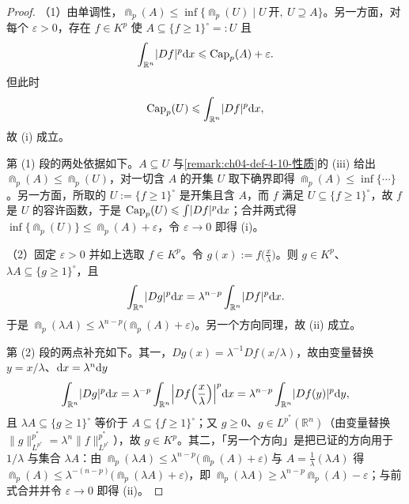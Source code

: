 \documentclass[../../main.tex]{subfiles}%
\begin{document}
\begin{proof}
（1）由单调性，$\Cap_p(A)\leqslant\inf\{\Cap_p(U)\mid U\ \text{开},\ U\supseteq A\}$。另一方面，对每个 $\varepsilon>0$，存在 $f\in K^p$ 使 $A\subseteq\{f\geqslant1\}^{\circ}=:U$ 且
\begin{align*}
\int_{\mathbb{R}^n}\lvert Df\rvert^p\mathrm{d} x\leqslant\operatorname{Cap}_p(A)+\varepsilon .
\end{align*}
但此时
\begin{align*}
\operatorname{Cap}_p(U)\leqslant\int_{\mathbb{R}^n}\lvert Df\rvert^p\mathrm{d} x ,
\end{align*}
故 (i) 成立。

第 (1) 段的两处依据如下。$A\subseteq U$ 与\cref{remark:ch04-def-4-10-性质}的 (iii) 给出 $\Cap_p(A)\leqslant\Cap_p(U)$，对一切含 $A$ 的开集 $U$ 取下确界即得 $\Cap_p(A)\leqslant\inf\{\cdots\}$。另一方面，所取的 $U:=\{f\geqslant1\}^{\circ}$ 是开集且含 $A$，而 $f$ 满足 $U\subseteq\{f\geqslant1\}^{\circ}$，故 $f$ 是 $U$ 的容许函数，于是 $\operatorname{Cap}_p(U)\leqslant\int\lvert Df\rvert^p\mathrm{d} x$；合并两式得 $\inf\{\Cap_p(U)\}\leqslant\Cap_p(A)+\varepsilon$，令 $\varepsilon\to0$ 即得 (i)。%

（2）固定 $\varepsilon>0$ 并如上选取 $f\in K^p$。令 $g(x):=f\bigl(\frac{x}{\lambda}\bigr)$。则 $g\in K^p$、$\lambda A\subseteq\{g\geqslant1\}^{\circ}$，且
\begin{align*}
\int_{\mathbb{R}^n}\lvert Dg\rvert^p\mathrm{d} x=\lambda^{n-p}\int_{\mathbb{R}^n}\lvert Df\rvert^p\mathrm{d} x .
\end{align*}
于是 $\Cap_p(\lambda A)\leqslant\lambda^{n-p}\bigl(\Cap_p(A)+\varepsilon\bigr)$。另一个方向同理，故 (ii) 成立。

第 (2) 段的两点补充如下。其一，$Dg(x)=\lambda^{-1}Df(x/\lambda)$，故由变量替换 $y=x/\lambda$、$\mathrm{d} x=\lambda^n\mathrm{d} y$
\begin{align*}
\int_{\mathbb{R}^n}\lvert Dg\rvert^p\mathrm{d} x=\lambda^{-p}\int_{\mathbb{R}^n}\Bigl\lvert Df\Bigl(\frac{x}{\lambda}\Bigr)\Bigr\rvert^p\mathrm{d} x=\lambda^{n-p}\int_{\mathbb{R}^n}\lvert Df(y)\rvert^p\mathrm{d} y ,
\end{align*}
且 $\lambda A\subseteq\{g\geqslant1\}^{\circ}$ 等价于 $A\subseteq\{f\geqslant1\}^{\circ}$；又 $g\geqslant0$、$g\in L^{p^*}(\mathbb{R}^n)$（由变量替换 $\lVert g\rVert_{L^{p^*}}^{p^*}=\lambda^n\lVert f\rVert_{L^{p^*}}^{p^*}$），故 $g\in K^p$。其二，「另一个方向」是把已证的方向用于 $1/\lambda$ 与集合 $\lambda A$：由 $\Cap_p(\lambda A)\leqslant\lambda^{n-p}\bigl(\Cap_p(A)+\varepsilon\bigr)$ 与 $A=\frac1\lambda(\lambda A)$ 得 $\Cap_p(A)\leqslant\lambda^{-(n-p)}\bigl(\Cap_p(\lambda A)+\varepsilon\bigr)$，即 $\Cap_p(\lambda A)\geqslant\lambda^{n-p}\Cap_p(A)-\varepsilon$；与前式合并并令 $\varepsilon\to0$ 即得 (ii)。


\end{proof}
\end{document}
